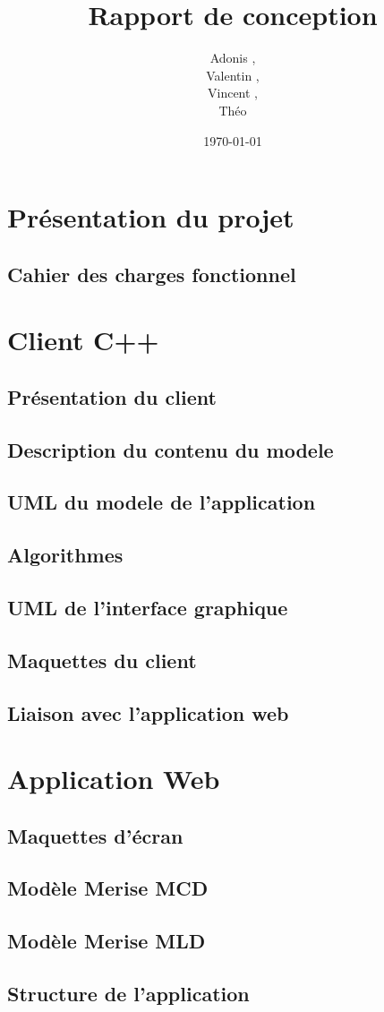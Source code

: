\documentclass[a4paper]{article}
\title{Rapport de conception}
\author{Adonis \bsc{Najimi},\\
 Valentin \bsc{Stern},\\
 Vincent \bsc{Albert},\\
 Théo \bsc{Gerriet}}
\date{\today}
\begin{document}
\maketitle
\newpage

\section{Présentation du projet}
	\subsection{Cahier des charges fonctionnel}
		
\section{Client C++}
	\subsection{Présentation du client}
		
	\subsection{Description du contenu du modele}
		
	\subsection{UML du modele de l'application}
		
	\subsection{Algorithmes}
		
	\subsection{UML de l'interface graphique}
		
	\subsection{Maquettes du client}
		
	\subsection{Liaison avec l'application web}
		
\section{Application Web}
	\subsection{Maquettes d'écran}
		
	\subsection{Modèle Merise MCD}
		
	\subsection{Modèle Merise MLD}
		
	\subsection{Structure de l'application}
		

\newpage
\tableofcontents
\end{document}
